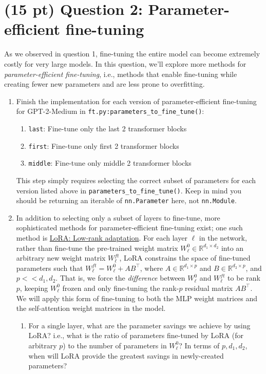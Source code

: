 \documentclass[12pt]{article}
\begin{document}
\section*{(15 pt) Question 2: Parameter-efficient fine-tuning}
As we observed in question 1, fine-tuning the entire model can become extremely costly for very large models. In this question, we'll explore more methods for \textit{parameter-efficient fine-tuning}, i.e., methods that enable fine-tuning while creating fewer new parameters and are less prone to overfitting.
\begin{enumerate}
    \item Finish the implementation for each version of parameter-efficient fine-tuning for GPT-2-Medium in \texttt{ft.py:parameters\_to\_fine\_tune()}:
    \begin{enumerate}
        \item \texttt{last}: Fine-tune only the last 2 transformer blocks
        \item \texttt{first}: Fine-tune only first 2 transformer blocks
        \item \texttt{middle}: Fine-tune only middle 2 transformer blocks
    \end{enumerate}
    This step simply requires selecting the correct subset of parameters for each version listed above in \texttt{parameters\_to\_fine\_tune()}. Keep in mind you should be returning an iterable of \texttt{nn.Parameter} here, not \texttt{nn.Module}.

    \item In addition to selecting only a subset of layers to fine-tune, more sophisticated methods for parameter-efficient fine-tuning exist; one such method is \href{https://arxiv.org/pdf/2106.09685.pdf}{LoRA: Low-rank adaptation}. For each layer $\ell$ in the network, rather than fine-tune the pre-trained weight matrix $W_\ell^0 \in \mathbb{R}^{d_1\times d_2}$ into an arbitrary new weight matrix $W_\ell^{ft}$, LoRA constrains the space of fine-tuned parameters such that $W_\ell^{ft} = W_\ell^0 + AB^\top$, where $A \in \mathbb{R}^{d_1\times p}$ and $B \in \mathbb{R}^{d_2\times p}$, and $p << d_1,d_2$. That is, we force the \textit{difference} between $W_\ell^0$ and $W_\ell^{ft}$ to be rank $p$, keeping $W_\ell^0$ frozen and only fine-tuning the rank-$p$ residual matrix $AB^\top$. We will apply this form of fine-tuning to both the MLP weight matrices and the self-attention weight matrices in the model.
    \begin{enumerate}
        \item For a single layer, what are the parameter savings we achieve by using LoRA? i.e., what is the ratio of parameters fine-tuned by LoRA (for arbitrary $p$) to the number of parameters in $W_\ell^0$? In terms of $p,d_1,d_2$, when will LoRA provide the greatest savings in newly-created parameters?


\end{enumerate}
\end{enumerate}
\end{document}
